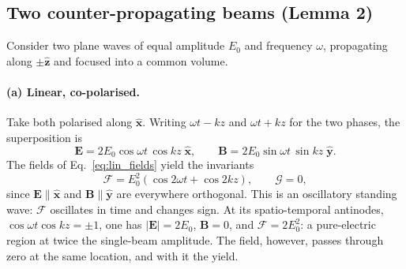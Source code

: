 \documentclass[aps,prd,reprint,superscriptaddress,nofootinbib,floatfix]{revtex4-2}
\begin{document}
\subsection{Two counter-propagating beams (Lemma 2)}

Consider two plane waves of equal amplitude $E_0$ and frequency $\omega$,
propagating along $\pm\hat{\mathbf{z}}$ and focused into a common volume.

\paragraph{(a) Linear, co-polarised.} Take both polarised along $\hat{\mathbf{x}}$.
Writing $\omega t-kz$ and $\omega t+kz$ for the two phases, the superposition is
\begin{equation}
\mathbf{E}=2E_0\cos\omega t\,\cos kz\;\hat{\mathbf{x}},
\qquad
\mathbf{B}=2E_0\sin\omega t\,\sin kz\;\hat{\mathbf{y}} .
\label{eq:lin_fields}
\end{equation}
The fields of Eq.~\eqref{eq:lin_fields} yield the invariants
\begin{equation}
\mathcal{F}=E_0^2\!\left(\cos 2\omega t+\cos 2kz\right),
\qquad
\mathcal{G}=0 ,
\label{eq:lin_inv}
\end{equation}
since $\mathbf{E}\parallel\hat{\mathbf{x}}$ and
$\mathbf{B}\parallel\hat{\mathbf{y}}$ are everywhere orthogonal. This is an
oscillatory standing wave: $\mathcal{F}$ oscillates in time and changes sign.
At its spatio-temporal antinodes, $\cos\omega t\cos kz=\pm1$, one has
$|\mathbf{E}|=2E_0$, $\mathbf{B}=0$, and $\mathcal{F}=2E_0^2$: a pure-electric
region at twice the single-beam amplitude. The field, however, passes through
zero at the same location, and with it the yield.
\end{document}
